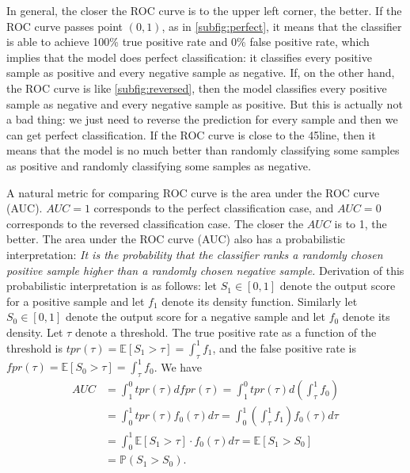 \documentclass[12pt]{article}
\begin{document}
In general, the closer the ROC curve is to the upper left corner, the better. If the ROC curve passes point $(0,1)$, as in \cref{subfig:perfect}, it means that the classifier is able to achieve 100\% true positive rate and 0\% false positive rate, which implies that the model does perfect classification: it classifies every positive sample as positive and every negative sample as negative. If, on the other hand, the ROC curve is like \cref{subfig:reversed}, then the model classifies every positive sample as negative and every negative sample as positive. But this is actually not a bad thing: we just need to reverse the prediction for every sample and then we can get perfect classification. If the ROC curve is close to the 45\degree line, then it means that the model is no much better than randomly classifying some samples as positive and randomly classifying some samples as negative.

A natural metric for comparing ROC curve is the area under the ROC curve (AUC). $AUC=1$ corresponds to the perfect classification case, and $AUC=0$ corresponds to the reversed classification case. The closer the $AUC$ is to 1, the better. The area under the ROC curve (AUC) also has a probabilistic interpretation: \emph{It is the probability that the classifier ranks a randomly chosen positive sample higher than a randomly chosen negative sample.} Derivation of this probabilistic interpretation is as follows: let $S_1\in[0,1]$ denote the output score for a positive sample and let $f_1$ denote its density function. Similarly let $S_0\in[0,1]$ denote the output score for a negative sample and let $f_0$ denote its density. Let $\tau$ denote a threshold. The true positive rate as a function of the threshold is $\displaystyle tpr(\tau)=\mathbb{E}[S_1>\tau]=\int_{\tau}^1f_1$, and the false positive rate is $\displaystyle fpr(\tau)=\mathbb{E}[S_0>\tau]=\int_{\tau}^1f_0$. We have
\[\begin{split}
AUC &= \int_1^0tpr(\tau)d fpr(\tau) =\int_1^0 tpr(\tau)d\left(\int_{\tau}^1f_0\right)\\
 &=\int_0^1tpr(\tau)f_0(\tau)d\tau = \int_0^1\left(\int_{\tau}^1f_1\right)f_0(\tau)d\tau\\
 &= \int_0^1 \mathbb{E}[S_1>\tau]\cdot f_0(\tau)d\tau = \mathbb{E}[S_1>S_0]\\
 &= \mathbb{P}(S_1>S_0).\\
\end{split}\]


\end{document}
